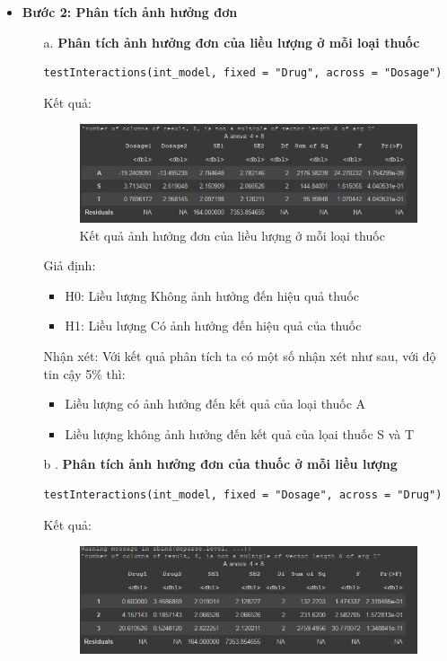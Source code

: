 \begin{itemize}
    \item \textbf{Bước 2: Phân tích ảnh hưởng đơn}
    \begin{itemize}
        \item[a.] \textbf{Phân tích ảnh hưởng đơn của liều lượng ở mỗi loại thuốc}
        \begin{lstlisting}
testInteractions(int_model, fixed = "Drug", across = "Dosage")
        \end{lstlisting}
    Kết quả:
    \begin{figure}[H]
        \centering
        \includegraphics[width=0.8\linewidth]{part01_figures/25.png}
        \caption{Kết quả ảnh hưởng đơn của liều lượng ở mỗi loại thuốc}
        \label{fig:Kết quả ảnh hưởng đơn của liều lượng ở mỗi loại thuốc}
    \end{figure}
    Giả định:
        \begin{itemize}
            \item H0: Liều lượng Không ảnh hưởng đến hiệu quả thuốc
            \item H1: Liều lượng Có ảnh hưởng đến hiệu quả của thuốc
        \end{itemize}
    Nhận xét: Với kết quả phân tích ta có một số nhận xét như sau, với độ tin cậy 5\% thì:
        \begin{itemize}
            \item Liều lượng có ảnh hưởng đến kết quả của loại thuốc A
            \item Liều lượng không ảnh hưởng đến kết quả của lọai thuốc S và T
        \end{itemize}
    \item [b].\textbf{ Phân tích ảnh hưởng đơn của thuốc ở mỗi liều lượng}
        \begin{lstlisting}
testInteractions(int_model, fixed = "Dosage", across = "Drug")
        \end{lstlisting}
        \newpage
        Kết quả:
        \begin{figure}[H]
            \centering
            \includegraphics[width=0.8\linewidth]{part01_figures/26.png}

\end{figure}
\end{itemize}
\end{itemize}
